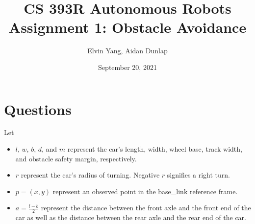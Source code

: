 \documentclass[11pt]{article}
\title{CS 393R Autonomous Robots \\ \large Assignment 1: Obstacle Avoidance}
\author{Elvin Yang, Aidan Dunlap}
\date{September 20, 2021}
\begin{document}
\maketitle

\section{Questions}

Let
\begin{itemize}
    \item
    $l$, $w$, $b$, $d$, and $m$ represent the car's length, width, wheel base,
    track width, and obstacle safety margin, respectively.

    \item
    $r$ represent the car's radius of turning. Negative $r$ signifies a right
    turn.

    \item
    $p = (x, y)$ represent an observed point in the base\_link reference frame.

    \item
    $a = \frac{l - b}{2}$ represent the distance between the front axle and the
    front end of the car as well as the distance between the rear axle and the
    rear end of the car.

\end{itemize}
\end{document}
